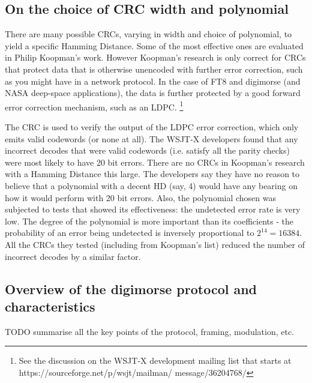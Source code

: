 \documentclass[a4paper]{tufte-handout}
\begin{document}
\subsection{On the choice of CRC width and polynomial}

There are many possible CRCs, varying in width and choice of polynomial, to yield a specific Hamming Distance.\cite{Williams1993}
Some of the most effective ones are evaluated in Philip Koopman's work\cite{Koopman2002}. However Koopman's research is only
correct for CRCs that protect data that is otherwise unencoded with further error correction, such as you might have in
a network protocol. In the case of FT8 and digimorse (and NASA deep-space applications), the data is further protected
by a good forward error correction mechanism, such as an
LDPC. \footnote{See the discussion on the WSJT-X development mailing list that starts at https://sourceforge.net/p/wsjt/mailman/
message/36204768/}

The CRC is used to verify the output of the LDPC error correction, which only emits valid codewords (or none at all).
The WSJT-X developers found that any incorrect decodes that were valid codewords (i.e. satisfy all the parity checks)
were most likely to have 20 bit errors. There are no CRCs in Koopman's research with a Hamming Distance this large.
The developers say they have no reason to believe that a polynomial with a decent HD (say, 4) would have any bearing on
how it would perform with 20 bit errors.
Also, the polynomial chosen was subjected to tests that showed its effectiveness: the undetected error rate is very low.
The degree of the polynomial is more important than its coefficients - the probability of an error being undetected is
inversely proportional to $2^{14} = 16384$. All the CRCs they tested (including from Koopman's list) reduced the number
of incorrect decodes by a similar factor.


\subsection{Overview of the digimorse protocol and characteristics}

TODO summarise all the key points of the protocol, framing, modulation, etc.

\pagebreak


\end{document}
